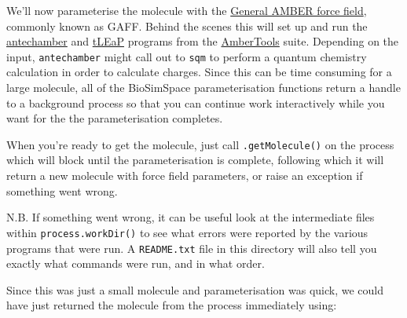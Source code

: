 We'll now parameterise the molecule with the
\href{http://ambermd.org/antechamber/gaff.html}{General AMBER force
field}, commonly known as GAFF. Behind the scenes this will set up and
run the
\href{http://ambermd.org/tutorials/basic/tutorial4b/}{antechamber} and
\href{https://ambermd.org/tutorials/pengfei/index.htm}{tLEaP} programs
from the \href{https://ambermd.org/AmberTools.php}{AmberTools} suite.
Depending on the input, \texttt{antechamber} might call out to
\texttt{sqm} to perform a quantum chemistry calculation in order to
calculate charges. Since this can be time consuming for a large
molecule, all of the BioSimSpace parameterisation functions return a
handle to a background process so that you can continue work
interactively while you want for the the parameterisation completes.

\begin{Shaded}
\begin{Highlighting}[]
\OperatorTok{=}
\end{Highlighting}
\end{Shaded}

When you're ready to get the molecule, just call \texttt{.getMolecule()}
on the process which will block until the parameterisation is complete,
following which it will return a new molecule with force field
parameters, or raise an exception if something went wrong.

\begin{Shaded}
\begin{Highlighting}[]
\OperatorTok{=}
\end{Highlighting}
\end{Shaded}

N.B. If something went wrong, it can be useful look at the intermediate
files within \texttt{process.workDir()} to see what errors were reported
by the various programs that were run. A \texttt{README.txt} file in
this directory will also tell you exactly what commands were run, and in
what order.

Since this was just a small molecule and parameterisation was quick, we
could have just returned the molecule from the process immediately
using:

\begin{Shaded}
\begin{Highlighting}[]
\OperatorTok{=}
\end{Highlighting}
\end{Shaded}

